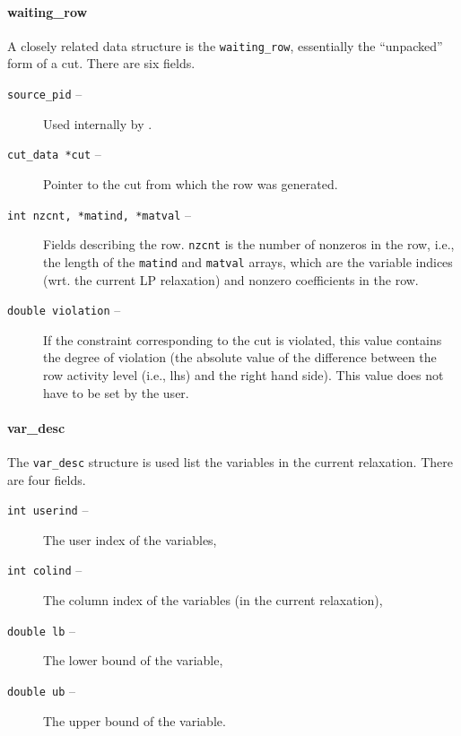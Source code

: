 \begin{description}
\begin{htmlonly}
\paragraph{waiting\_row}
\label{waiting_row}
\end{htmlonly}
\begin{latexonly}
\end{latexonly}

A closely related data structure is the {\tt waiting\_row},
essentially the ``unpacked'' form of a cut. There are six fields.

\begin{description}

\item[{\tt source\_pid} --] Used internally by \BB.

\item[{\tt cut\_data *cut} --] Pointer to the cut from which the row was generated.

\item[{\tt int nzcnt, *matind, *matval} --] Fields describing the row. {\tt nzcnt} is the number of nonzeros in
the row, i.e., the length of the {\tt matind} and {\tt matval} arrays,
which are the variable indices (wrt. the current LP relaxation) and
nonzero coefficients in the row.

\item[{\tt double violation} --] If the constraint corresponding to the cut is violated, this value
contains the degree of violation (the absolute value of the difference
between the row activity level (i.e., lhs) and the right hand
side). This value does not have to be set by the user.

\end{description}

\begin{htmlonly}
\paragraph{var\_desc}
\end{htmlonly}
\begin{latexonly}
\end{latexonly}

The {\tt var\_desc} structure is used list the variables in the current
relaxation. There are four fields.

\begin{description}
\item[{\tt int userind} --] The user index of the variables,
\item[{\tt int colind} --] The column index of the variables (in the
current relaxation),
\item[{\tt double lb} --] The lower bound of the variable,
\item[{\tt double ub} --] The upper bound of the variable.
\end{description}

\end{description}

